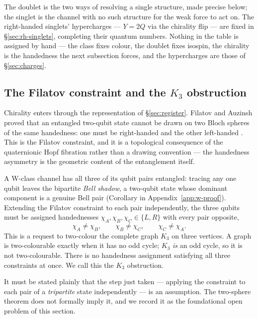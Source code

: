 The doublet is the two ways of resolving a single structure, made precise below; the singlet is the
channel with no such structure for the weak force to act on.\label{sec:zoo-singlets} The
right-handed singlets' hypercharges --- $Y = 2Q$ via the chirality flip --- are fixed in
\S\ref{sec:rh-singlets}, completing their quantum numbers. Nothing in the table is assigned by
hand --- the class fixes colour, the doublet fixes isospin, the chirality is the handedness the
next subsection forces, and the hypercharges are those of \S\ref{sec:charges}.

\subsection{The Filatov constraint and the \texorpdfstring{$K_3$}{K3} obstruction}

Chirality enters through the representation of \S\ref{sec:register}. Filatov and Auzinsh proved that
an entangled two-qubit state cannot be drawn on two Bloch spheres of the same handedness: one must be
right-handed and the other left-handed \autocite{filatov2024towards}. This is the Filatov
constraint, and it is a topological consequence of the quaternionic Hopf fibration rather than a
drawing convention --- the handedness asymmetry is the geometric content of the entanglement itself.

A W-class channel has all three of its qubit pairs entangled: tracing any one qubit leaves the bipartite \emph{Bell shadow}, a two-qubit state whose dominant
component is a genuine Bell pair (Corollary in Appendix~\ref{app:w-proof}). Extending the
Filatov constraint to each pair independently, the three qubits must be assigned handednesses
$\chi_A,\chi_B,\chi_C \in \{L,R\}$ with every pair opposite,
\begin{equation}
  \chi_A \neq \chi_B, \qquad \chi_B \neq \chi_C, \qquad \chi_C \neq \chi_A.
\end{equation}
This is a request to two-colour the complete graph $K_3$ on three vertices. A graph is two-colourable
exactly when it has no odd cycle; $K_3$ \emph{is} an odd cycle, so it is not two-colourable. There
is no handedness assignment satisfying all three constraints at once. We call this the $K_3$
obstruction.

It must be stated plainly that the step just taken --- applying the constraint to each pair of a
\emph{tripartite} state independently --- is an assumption. The two-sphere theorem does not
formally imply it, and we record it as the foundational open problem of this section.

